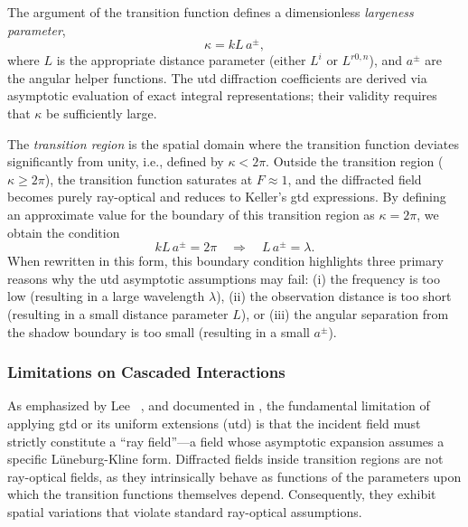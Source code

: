 The argument of the transition function defines a dimensionless \emph{largeness parameter},
\begin{equation}
  \kappa = kL\,a^{\pm},
\end{equation}
where $L$ is the appropriate distance parameter (either $L^i$ or $L^{r0,n}$), and $a^{\pm}$ are the angular helper functions. The \gls{utd} diffraction coefficients are derived via asymptotic evaluation of exact integral representations; their validity requires that $\kappa$ be sufficiently large.

The \emph{transition region} is the spatial domain where the transition function deviates significantly from unity, i.e., defined by $\kappa < 2\pi$. Outside the transition region ($\kappa \ge 2\pi$), the transition function saturates at $F \approx 1$, and the diffracted field becomes purely ray-optical and reduces to Keller's \gls{gtd} expressions. By defining an approximate value for the boundary of this transition region as $\kappa = 2\pi$, we obtain the condition
\begin{equation}
  kL\,a^{\pm} = 2\pi \quad \Rightarrow \quad L\,a^{\pm} = \lambda.
\end{equation}
When rewritten in this form, this boundary condition highlights three primary reasons why the \gls{utd} asymptotic assumptions may fail: (i) the frequency is too low (resulting in a large \gls{wavelength} $\lambda$), (ii) the observation distance is too short (resulting in a small distance parameter $L$), or (iii) the angular separation from the shadow boundary is too small (resulting in a small $a^{\pm}$).

\subsubsection{Limitations on Cascaded Interactions}

As emphasized by Lee \etal~, and documented in , the fundamental limitation of applying \gls{gtd} or its uniform extensions (\gls{utd}) is that the incident field must strictly constitute a \enquote{ray field}---a field whose asymptotic expansion assumes a specific Lüneburg-Kline form. Diffracted fields inside transition regions are not ray-optical fields, as they intrinsically behave as functions of the parameters upon which the transition functions themselves depend. Consequently, they exhibit spatial variations that violate standard ray-optical assumptions.


